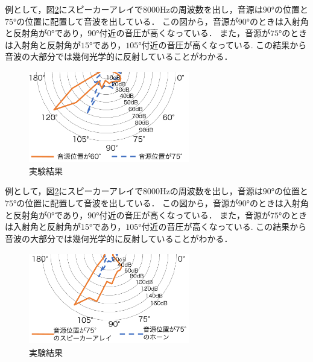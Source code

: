 \documentclass[twocolumn,10pt,a4j]{ltjsarticle}
\begin{document}
例として，図\ref{fig:結果}にスピーカーアレイで8000Hzの周波数を出し，音源は$\ang{90}$の位置と$\ang{75}$の位置に配置して音波を出している．
この図から，音源が$\ang{90}$のときは入射角と反射角が$\ang{0}$であり，$\ang{90}$付近の音圧が高くなっている．
また，音源が$\ang{75}$のときは入射角と反射角が$\ang{15}$であり，$\ang{105}$付近の音圧が高くなっている.
この結果から音波の大部分では幾何光学的に反射していることがわかる．

\vspace{1ex}
\begin{figure}[h]
\begin{center}
 \includegraphics[clip,width=70mm,height=40mm]{keltuka2.pdf}
\end{center}
 \caption{実験結果}
 \label{fig:結果}
\end{figure}

例として，図\ref{fig:結果}にスピーカーアレイで8000Hzの周波数を出し，音源は$\ang{90}$の位置と$\ang{75}$の位置に配置して音波を出している．
この図から，音源が$\ang{90}$のときは入射角と反射角が$\ang{0}$であり，$\ang{90}$付近の音圧が高くなっている．
また，音源が$\ang{75}$のときは入射角と反射角が$\ang{15}$であり，$\ang{105}$付近の音圧が高くなっている.
この結果から音波の大部分では幾何光学的に反射していることがわかる．

\vspace{1ex}
\begin{figure}[h]
\begin{center}
 \includegraphics[clip,width=70mm,height=40mm]{keltuka3.pdf}
\end{center}
 \caption{実験結果}
 \label{fig:結果}
\end{figure}
\end{document}
